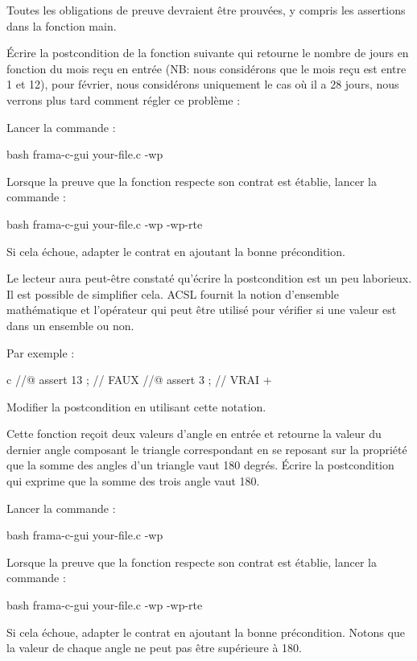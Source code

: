 Toutes les obligations de preuve devraient être prouvées, y compris les
assertions dans la fonction main.




Écrire la postcondition de la fonction suivante qui retourne le nombre de
jours en fonction du mois reçu en entrée (NB: nous considérons que le mois
reçu est entre 1 et 12), pour février, nous considérons uniquement le cas
où il a 28 jours, nous verrons plus tard comment régler ce problème :




Lancer la commande :


\begin{CodeBlock}{bash}
frama-c-gui your-file.c -wp
\end{CodeBlock}


Lorsque la preuve que la fonction respecte son contrat est établie, lancer
la commande :

\begin{CodeBlock}{bash}
frama-c-gui your-file.c -wp -wp-rte
\end{CodeBlock}


Si cela échoue, adapter le contrat en ajoutant la bonne précondition.


Le lecteur aura peut-être constaté qu'écrire la postcondition est un peu
laborieux. Il est possible de simplifier cela. ACSL fournit la notion
d'ensemble mathématique et l'opérateur  qui
peut être utilisé pour vérifier si une valeur est dans un ensemble ou non.


Par exemple :

\begin{CodeBlock}{c}
//@ assert 13  ; // FAUX
//@ assert 3   ; // VRAI
+\end{CodeBlock}


Modifier la postcondition en utilisant cette notation.




Cette fonction reçoit deux valeurs d'angle en entrée et retourne
la valeur du dernier angle composant le triangle correspondant en se
reposant sur la propriété que la somme des angles d'un triangle vaut
180 degrés. Écrire la postcondition qui exprime que la somme des trois
angle vaut 180.




Lancer la commande :


\begin{CodeBlock}{bash}
frama-c-gui your-file.c -wp
\end{CodeBlock}


Lorsque la preuve que la fonction respecte son contrat est établie, lancer
la commande :

\begin{CodeBlock}{bash}
frama-c-gui your-file.c -wp -wp-rte
\end{CodeBlock}


Si cela échoue, adapter le contrat en ajoutant la bonne précondition.
Notons que la valeur de chaque angle ne peut pas être supérieure à 180.
